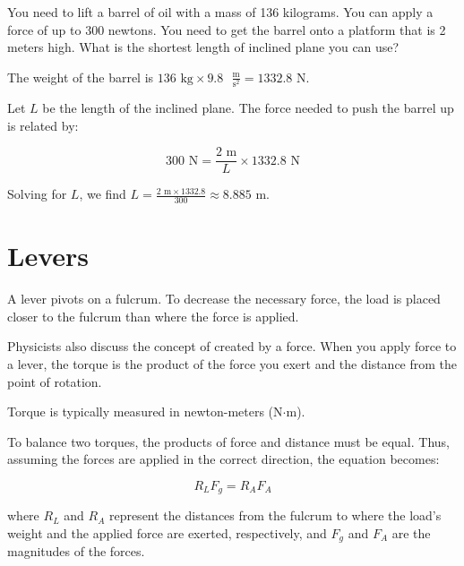 \begin{Exercise}[title={Ramp}, label=ramp]
You need to lift a barrel of oil with a mass of 136 kilograms. You can apply a 
force of up to 300 newtons. You need to get the barrel onto a platform that is 
2 meters high. What is the shortest length of inclined plane you can use?
\end{Exercise}
\begin{Answer}[ref=ramp]
The weight of the barrel is \( 136 \text{ kg} \times 9.8 \text{ } 
\frac{\text{m}}{\text{s}^2}= 1332.8 \text{ N}\).

Let \( L \) be the length of the inclined plane. The force needed to push the 
barrel up is related by:

\[
300 \text{ N}= \frac{2 \text{ m}}{L} \times 1332.8 \text{ N}
\]

Solving for \( L \), we find \( L = \frac{2 \text{ m} \times 1332.8}{300} 
\approx 8.885 \text{ m}\).
\end{Answer}

\section{Levers}

A lever pivots on a fulcrum. To decrease the necessary force, the load is placed 
closer to the fulcrum than where the force is applied.

Physicists also discuss the concept of  created by a force. When 
you apply force to a lever, the torque is the product of the force you exert and 
the distance from the point of rotation.

Torque is typically measured in newton-meters (N$\cdot$m).

To balance two torques, the products of force and distance must be equal. Thus, 
assuming the forces are applied in the correct direction, the equation becomes:

\begin{equation}
    R_L F_g = R_A F_A
    \label{eq:leversBalanced}
\end{equation}


where \( R_L \) and \( R_A \) represent the distances from the fulcrum to where 
the load’s weight and the applied force are exerted, respectively, and \( F_g \) 
and \( F_A \) are the magnitudes of the forces.


